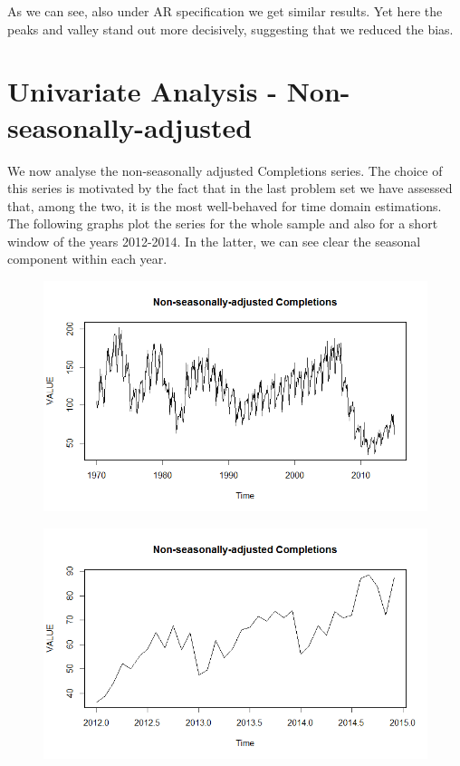 \documentclass[12pt]{article} %
\begin{document}
As we can see, also under AR specification we get similar results. Yet here the peaks and valley stand out more decisively, suggesting that we reduced the bias.

\section{Univariate Analysis - Non-seasonally-adjusted}

We now analyse the non-seasonally adjusted Completions series. The choice of this series is motivated by the fact that in the last problem set we have assessed that, among the two, it is the most well-behaved for time domain estimations. The following graphs plot the series for the whole sample and also for a short window of the years 2012-2014. In the latter, we can see clear the seasonal component within each year. 


\begin{figure}[h!]
\begin{center}
\includegraphics[scale=0.55]{compNSA}
\caption{}
\end{center}
\end{figure}

\begin{figure}[h!]
\begin{center}
\includegraphics[scale=0.55]{compNSAwindow}
\caption{}
\end{center}
\end{figure}
\end{document}
